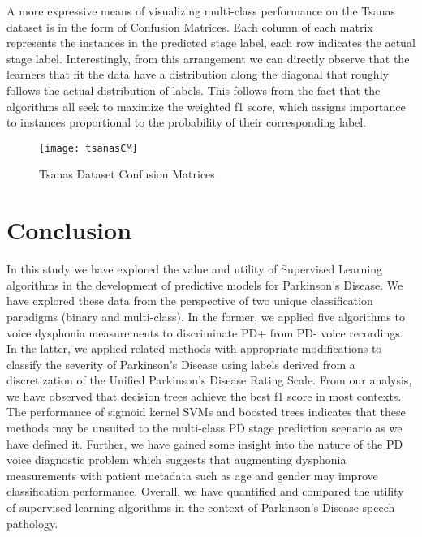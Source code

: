 \documentclass[12pt]{article}
\begin{document}
A more expressive means of visualizing multi-class performance on the Tsanas dataset is in the form of Confusion Matrices. Each column of each matrix represents the instances in the predicted stage label, each row indicates the actual stage label. Interestingly, from this arrangement we can directly observe that the learners that fit the data have a distribution along the diagonal that roughly follows the actual distribution of labels. This follows from the fact that the algorithms all seek to maximize the weighted f1 score, which assigns importance to instances proportional to the probability of their corresponding label.

\begin{figure}
    \centering
    \texttt{[image: tsanasCM]}
    \caption{Tsanas Dataset Confusion Matrices}
\end{figure}

\section{Conclusion}
\label{sec:conc}
In this study we have explored the value and utility of Supervised Learning algorithms in the development of predictive models for Parkinson's Disease. We have explored these data from the perspective of two unique classification paradigms (binary and multi-class). In the former, we applied five algorithms to voice dysphonia measurements to discriminate PD+ from PD- voice recordings. In the latter, we applied related methods with appropriate modifications to classify the severity of Parkinson's Disease using labels derived from a discretization of the Unified Parkinson's Disease Rating Scale. From our analysis, we have observed that decision trees achieve the best f1 score in most contexts. The performance of sigmoid kernel SVMs and boosted trees indicates that these methods may be unsuited to the multi-class PD stage prediction scenario as we have defined it. Further, we have gained some insight into the nature of the PD voice diagnostic problem which suggests that augmenting dysphonia measurements with patient metadata such as age and gender may improve classification performance. Overall, we have quantified and compared the utility of supervised learning algorithms in the context of Parkinson's Disease speech pathology.



\end{document}
